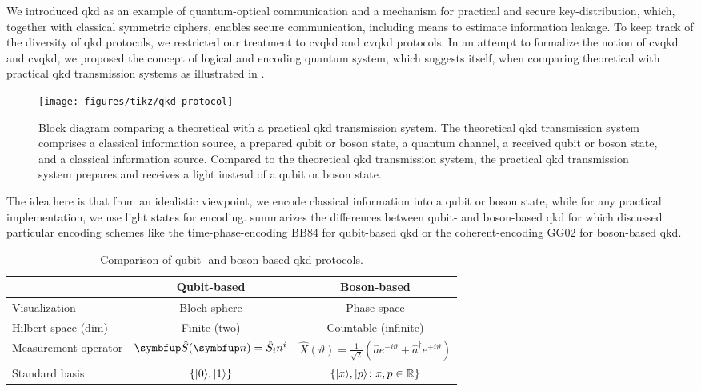 
We introduced \gls{qkd} as an example of quantum-optical communication and a mechanism for practical and secure key-distribution, which, together with classical symmetric ciphers, enables secure communication, including means to estimate information leakage.
To keep track of the diversity of \gls{qkd} protocols, we restricted our treatment to \gls{cvqkd} and \gls{cvqkd} protocols.
In an attempt to formalize the notion of \gls{cvqkd} and \gls{cvqkd}, we proposed the concept of logical and encoding quantum system, which suggests itself, when comparing theoretical with practical \gls{qkd} transmission systems as illustrated in .
\begin{figure}[htb]
	\centering
	\texttt{[image: figures/tikz/qkd-protocol]}
	\caption{Block diagram comparing a theoretical with a practical \gls{qkd} transmission system. The theoretical \gls{qkd} transmission system comprises a classical information source, a prepared qubit or boson state, a quantum channel, a received qubit or boson state, and a classical information source. Compared to the theoretical \gls{qkd} transmission system, the practical \gls{qkd} transmission system prepares and receives a light instead of a qubit or boson state.}\label{fig:qkd_protocol}
\end{figure}
The idea here is that from an idealistic viewpoint, we encode classical information into a qubit or boson state, while for any practical implementation, we use light states for encoding.
 summarizes the differences between qubit- and boson-based \gls{qkd} for which discussed particular encoding schemes like the time-phase-encoding BB84 for qubit-based \gls{qkd} or the coherent-encoding GG02 for boson-based \gls{qkd}.
\begin{table}[htb]
	\centering	
	\begin{tabular}{lcc}
		\toprule
			& Qubit-based & Boson-based \\
		\midrule
			Visualization & Bloch sphere & Phase space \\
			Hilbert space (dim) & Finite (two) & Countable (infinite) \\
			Measurement operator & $\vb{\hat{S}}(\vb{n})=\hat{S}_in^i$ & $\hat{X}(\vartheta)=\frac{1}{\sqrt{2}}\left(\hat{a}e^{-i\vartheta}+\hat{a}^\dagger e^{+i\vartheta}\right)$ \\
			Standard basis & $\left\{\lvert0\rangle,\lvert1\rangle\right\}$ & $\left\{\lvert x\rangle,\lvert p\rangle\colon x,p\in\mathbb{R}\right\}$ \\
		\bottomrule
	\end{tabular}
	\caption{Comparison of qubit- and boson-based \gls{qkd} protocols.}\label{tab:qkd_comparison}
\end{table}
